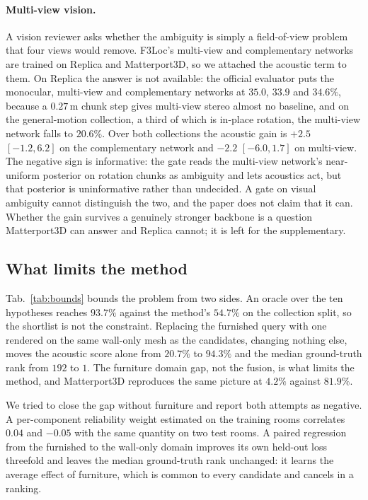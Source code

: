 \paragraph{Multi-view vision.} A vision reviewer asks whether the ambiguity is
simply a field-of-view problem that four views would remove. F3Loc's
multi-view and complementary networks are trained on Replica and Matterport3D,
so we attached the acoustic term to them. On Replica the answer is not
available: the official evaluator puts the monocular, multi-view and
complementary networks at $35.0$, $33.9$ and $34.6\%$, because a $0.27$\,m
chunk step gives multi-view stereo almost no baseline, and on the
general-motion collection, a third of which is in-place rotation, the
multi-view network falls to $20.6\%$. Over both collections the acoustic gain
is $+2.5$ $[-1.2, 6.2]$ on the complementary network and $-2.2$ $[-6.0, 1.7]$
on multi-view. The negative sign is informative: the gate reads the multi-view
network's near-uniform posterior on rotation chunks as ambiguity and lets
acoustics act, but that posterior is uninformative rather than undecided. A
gate on visual ambiguity cannot distinguish the two, and the paper does not
claim that it can. Whether the gain survives a genuinely stronger backbone is
a question Matterport3D can answer and Replica cannot; it is left for the
supplementary.

\subsection{What limits the method}
\label{sec:bounds}



Tab.~\ref{tab:bounds} bounds the problem from two sides. An oracle over the
ten hypotheses reaches $93.7\%$ against the method's $54.7\%$ on the
collection split, so the shortlist is not the constraint. Replacing the
furnished query with one rendered on the same wall-only mesh as the candidates,
changing nothing else, moves the acoustic score alone from $20.7\%$ to
$94.3\%$ and the median ground-truth rank from $192$ to $1$. The furniture
domain gap, not the fusion, is what limits the method, and Matterport3D
reproduces the same picture at $4.2\%$ against $81.9\%$.

We tried to close the gap without furniture and report both attempts as
negative. A per-component reliability weight estimated on the training rooms
correlates $0.04$ and $-0.05$ with the same quantity on two test rooms. A
paired regression from the furnished to the wall-only domain improves its own
held-out loss threefold and leaves the median ground-truth rank unchanged: it
learns the average effect of furniture, which is common to every candidate and
cancels in a ranking.

